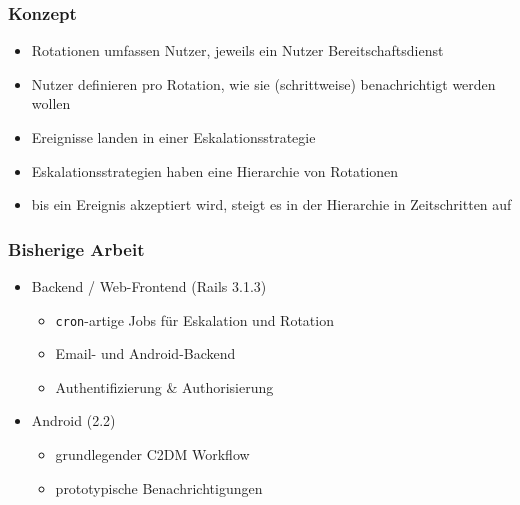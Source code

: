 \documentclass[10pt]{beamer}
\begin{document}
\begin{frame}[c]
  \frametitle{Konzept}
  \begin{itemize}
    \item Rotationen umfassen Nutzer, jeweils ein Nutzer Bereitschaftsdienst
    \item Nutzer definieren pro Rotation, wie sie (schrittweise) benachrichtigt werden wollen
    \item Ereignisse landen in einer Eskalationsstrategie
    \item Eskalationsstrategien haben eine Hierarchie von Rotationen
    \item bis ein Ereignis akzeptiert wird, steigt es in der Hierarchie in Zeitschritten auf
  \end{itemize}
\end{frame}

\begin{frame}[c]
  \frametitle{Bisherige Arbeit}
  \begin{itemize}
    \item Backend / Web-Frontend (Rails 3.1.3)
    \begin{itemize}
      \item \texttt{cron}-artige Jobs für Eskalation und Rotation
      \item Email- und Android-Backend
      \item Authentifizierung \& Authorisierung
    \end{itemize}
    \item Android (2.2)
    \begin{itemize}
      \item grundlegender C2DM Workflow
      \item prototypische Benachrichtigungen
    \end{itemize}
  \end{itemize}
\end{frame}
\end{document}

